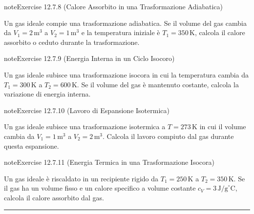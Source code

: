 \documentclass[letterpaper,10pt,italian]{jupyterBook}
\begin{document}
\begin{sphinxadmonition}{note}{Exercise 12.7.8 (Calore Assorbito in una Trasformazione Adiabatica)}



\sphinxAtStartPar
Un gas ideale compie una trasformazione adiabatica. Se il volume del gas cambia da \(V_1 = 2 \, \text{m}^3\) a \(V_2 = 1 \, \text{m}^3\) e la temperatura iniziale è \(T_1 = 350 \, \text{K}\), calcola il calore assorbito o ceduto durante la trasformazione.
\end{sphinxadmonition}
 \label{exercise:ch/thermodynamics/principles-problems-exercise-8}

\begin{sphinxadmonition}{note}{Exercise 12.7.9 (Energia Interna in un Ciclo Isocoro)}



\sphinxAtStartPar
Un gas ideale subisce una trasformazione isocora in cui la temperatura cambia da \(T_1 = 300 \, \text{K}\) a \(T_2 = 600 \, \text{K}\). Se il volume del gas è mantenuto costante, calcola la variazione di energia interna.
\end{sphinxadmonition}
 \label{exercise:ch/thermodynamics/principles-problems-exercise-9}

\begin{sphinxadmonition}{note}{Exercise 12.7.10 (Lavoro di Espansione Isotermica)}



\sphinxAtStartPar
Un gas ideale subisce una trasformazione isotermica a \(T = 273 \, \text{K}\) in cui il volume cambia da \(V_1 = 1 \, \text{m}^3\) a \(V_2 = 2 \, \text{m}^3\). Calcola il lavoro compiuto dal gas durante questa espansione.
\end{sphinxadmonition}
 \label{exercise:ch/thermodynamics/principles-problems-exercise-10}

\begin{sphinxadmonition}{note}{Exercise 12.7.11 (Energia Termica in una Trasformazione Isocora)}



\sphinxAtStartPar
Un gas ideale è riscaldato in un recipiente rigido da \(T_1 = 250 \, \text{K}\) a \(T_2 = 350 \, \text{K}\). Se il gas ha un volume fisso e un calore specifico a volume costante \(c_V = 3 \, \text{J/g}^\circ \text{C}\), calcola il calore assorbito dal gas.
\end{sphinxadmonition}


\bigskip\hrule\bigskip
\end{document}
